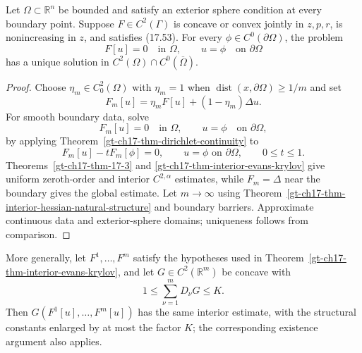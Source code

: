 \begin{theorem}
\label{gt-ch17-thm-dirichlet-concave-uniformly-elliptic}
Let $\Omega\subset\mathbb R^n$ be bounded and satisfy an exterior sphere
condition at every boundary point.  Suppose $F\in C^2(\Gamma)$ is concave or
convex jointly in $z,p,r$, is nonincreasing in $z$, and satisfies (17.53).
For every $\phi\in C^0(\partial\Omega)$, the problem
\[
F[u]=0\quad\text{in }\Omega,
\qquad u=\phi\quad\text{on }\partial\Omega
\]
has a unique solution in $C^2(\Omega)\cap C^0(\overline\Omega)$.
\end{theorem}
\begin{proof}
\sketch Choose $\eta_m\in C_0^2(\Omega)$ with $\eta_m=1$ when
$\operatorname{dist}(x,\partial\Omega)\ge1/m$ and set
\begin{equation}\tag{17.57}
F_m[u]=\eta_mF[u]+(1-\eta_m)\Delta u.
\end{equation}
For smooth boundary data, solve
\begin{equation}
\tag{17.58}
F_m[u]=0\quad\text{in }\Omega,
\qquad u=\phi\quad\text{on }\partial\Omega,
\end{equation}
by applying
Theorem~\ref{gt-ch17-thm-dirichlet-continuity} to
\[
F_m[u]-tF_m[\phi]=0,
\qquad u=\phi\text{ on }\partial\Omega,
\qquad 0\le t\le1.
\tag{17.59}
\]
Theorems~\ref{gt-ch17-thm-17-3} and
\ref{gt-ch17-thm-interior-evans-krylov} give uniform zeroth-order and interior
$C^{2,\alpha}$ estimates, while $F_m=\Delta$ near the boundary gives the
global estimate.  Let $m\to\infty$ using
Theorem~\ref{gt-ch17-thm-interior-hessian-natural-structure} and boundary
barriers.
Approximate continuous data and exterior-sphere domains; uniqueness follows
from comparison.
\end{proof}

More generally, let $F^1,\ldots,F^m$ satisfy the hypotheses used in
Theorem~\ref{gt-ch17-thm-interior-evans-krylov}, and let
$G\in C^2(\mathbb R^m)$ be concave with
\begin{equation}\tag{17.60}
1\le\sum_{\nu=1}^mD_\nu G\le K.
\end{equation}
Then $G(F^1[u],\ldots,F^m[u])$ has the same interior estimate, with the
structural constants enlarged by at most the factor $K$; the corresponding
existence argument also applies.

